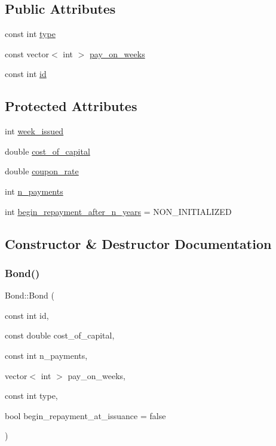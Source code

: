 \subsection*{Public Attributes}
\begin{DoxyCompactItemize}
\item 
const int \mbox{\hyperlink{classBond_a48da24878beedd71cbaa990cea860667}{type}}
\item 
const vector$<$ int $>$ \mbox{\hyperlink{classBond_ae8dd46fcbf95c993460ffe4ea1f52739}{pay\+\_\+on\+\_\+weeks}}
\item 
const int \mbox{\hyperlink{classBond_a7f75bcafbc16676ad6dbafbf40afae4a}{id}}
\end{DoxyCompactItemize}
\subsection*{Protected Attributes}
\begin{DoxyCompactItemize}
\item 
int \mbox{\hyperlink{classBond_a30d48d158cbbd9c7b4bfa0012c89590a}{week\+\_\+issued}}
\item 
double \mbox{\hyperlink{classBond_ad98df7d28b398e620286f95ee085439b}{cost\+\_\+of\+\_\+capital}}
\item 
double \mbox{\hyperlink{classBond_a5f66785534e24caa43d9f730130a6463}{coupon\+\_\+rate}}
\item 
int \mbox{\hyperlink{classBond_a4a227b6de2eeada118d82ab1633b1db8}{n\+\_\+payments}}
\item 
int \mbox{\hyperlink{classBond_a8d808753f9708e841dfceca72a110737}{begin\+\_\+repayment\+\_\+after\+\_\+n\+\_\+years}} = N\+O\+N\+\_\+\+I\+N\+I\+T\+I\+A\+L\+I\+Z\+ED
\end{DoxyCompactItemize}


\subsection{Constructor \& Destructor Documentation}
\mbox{\label{classBond_ac2ed54d795433c9c6a4236629553fb83}} 
\subsubsection{\texorpdfstring{Bond()}{Bond()}\hspace{0.1cm}{\footnotesize\ttfamily [1/4]}}
{\footnotesize\ttfamily Bond\+::\+Bond (\begin{DoxyParamCaption}\item[{const int}]{id,  }\item[{const double}]{cost\+\_\+of\+\_\+capital,  }\item[{const int}]{n\+\_\+payments,  }\item[{vector$<$ int $>$}]{pay\+\_\+on\+\_\+weeks,  }\item[{const int}]{type,  }\item[{bool}]{begin\+\_\+repayment\+\_\+at\+\_\+issuance = {\ttfamily false} }\end{DoxyParamCaption})}


